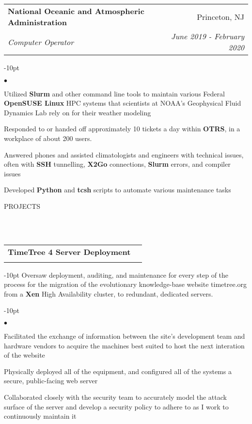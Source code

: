 \documentclass[12pt]{article}
\makeatletter
\newcommand{\header}[1]{
	\vspace*{12pt} %
	{\hspace*{-14pt}\vspace*{6pt} #1}
	\vspace*{-6pt} 
	\lineunder
}
\newcommand{\lineunder}{
	\vspace*{-8pt} \\ 
	\hspace*{-18pt} 
	\hrulefill \\
}
\newcommand{\subheading}[4]{
 	\vspace{5pt}
    	\begin{tabular*}{1.01\textwidth}
    		{l@{\extracolsep{\fill}}r}
      		\hspace{-16pt}\textbf{#1} & #2 \\
      		\hspace{-16pt}\textit{\small#3} & \textit{\small #4} \\
    	\end{tabular*}
    \vspace{-4pt}
}
\newenvironment{achievements}{
\begin{adjustwidth}{-10pt}{}
  \begin{list}{$\bullet$}{
  	\topsep 0pt \itemsep -4pt}}
  	{\vspace*{2pt}\end{list}
\end{adjustwidth}
}
\makeatother
\begin{document}
\subheading
	{National Oceanic and Atmospheric Administration}{Princeton, NJ}
	{Computer Operator}{June 2019 - February 2020}
	\begin{achievements}
		\item Utilized \textbf{Slurm} and other command line tools to maintain various Federal \textbf{OpenSUSE Linux} HPC systems that scientists at NOAA's Geophysical Fluid Dynamics Lab rely on for their weather modeling
		\item Responded to or handed off approximately 10 tickets a day within \textbf{OTRS}, in a workplace of about 200 users.	
		\item Answered phones and assisted climatologists and engineers with technical issues, often with \textbf{SSH} tunnelling, \textbf{X2Go} connections, \textbf{Slurm} errors, and compiler issues
		\item Developed \textbf{Python} and \textbf{tcsh} scripts to automate various maintenance tasks
		
		
	\end{achievements}


\vspace{-8pt}
\header{PROJECTS}

	
\subheading{TimeTree 4 Server Deployment}{}{}{}
	\vspace{-15pt}
	\begin{adjustwidth}{-10pt}{}
	Oversaw deployment, auditing, and maintenance for every step of the process for the migration of the evolutionary knowledge-base website timetree.org from a \textbf{Xen} High Availability cluster, to redundant, dedicated servers.
	\end{adjustwidth}
	\begin{achievements}		
		\item Facilitated the exchange of information between the site's development team and hardware vendors to acquire the machines best suited to host the next interation of the website
		\item Physically deployed all of the equipment, and configured all of the systems a secure, public-facing web server
		\item Collaborated closely with the security team to accurately model the attack surface of the server and develop a security policy to adhere to as I work to continuously maintain it
	\end{achievements}
\end{document}

